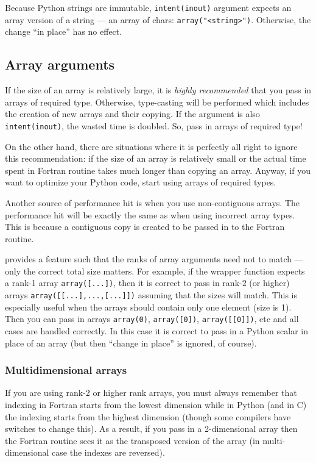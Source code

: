 Because Python strings are immutable, \texttt{intent(inout)} argument
expects an array version of a string --- an array of chars:
\texttt{array("<string>")}. 
Otherwise, the change ``in place'' has no effect.


\subsection{Array arguments}
\label{sec:arrays}

If the size of an array is relatively large, it is \emph{highly
  recommended} that you pass in arrays of required type. Otherwise,
type-casting will be performed which includes the creation of new
arrays and their copying.  If the argument is also
\texttt{intent(inout)}, the wasted time is doubled. So, pass in arrays
of required type!

On the other hand, there are situations where it is perfectly all
right to ignore this recommendation: if the size of an array is
relatively small or the actual time spent in Fortran routine takes
much longer than copying an array.  Anyway, if you want to optimize
your Python code, start using arrays of required types.

Another source of performance hit is when you use non-contiguous
arrays. The performance hit will be exactly the same as when using
incorrect array types.  This is because a contiguous copy is created
to be passed in to the Fortran routine.

\fpy provides a feature such that the ranks of array arguments need
not to match --- only the correct total size matters. For example, if
the wrapper function expects a rank-1 array \texttt{array([...])},
then it is correct to pass in rank-2 (or higher) arrays
\texttt{array([[...],...,[...]])} assuming that the sizes will match.
This is especially useful when the arrays should contain only one
element (size is 1).  Then you can pass in arrays \texttt{array(0)},
\texttt{array([0])}, \texttt{array([[0]])}, etc and all cases are
handled correctly. In this case it is correct to pass in a Python
scalar in place of an array (but then ``change in place'' is ignored,
of course).

\subsubsection{Multidimensional arrays}

If you are using rank-2 or higher rank arrays, you must always
remember that indexing in Fortran starts from the lowest dimension
while in Python (and in C) the indexing starts from the highest
dimension (though some compilers have switches to change this).  As a
result, if you pass in a 2-dimensional array then the Fortran routine
sees it as the transposed version of the array (in multi-dimensional
case the indexes are reversed).

